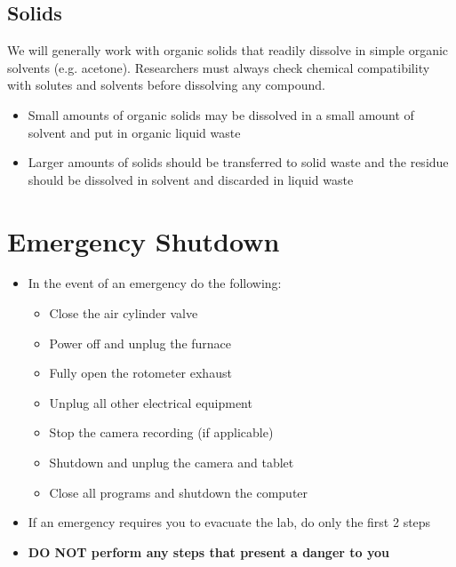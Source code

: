 \documentclass[letterpaper,11pt]{article}
\begin{document}
    \subsection{Solids} \label{sec:spill_solid}
    We will generally work with organic solids that readily dissolve in simple
    organic solvents (e.g. acetone). Researchers must always check chemical 
    compatibility with solutes and solvents before dissolving any compound.
    \begin{itemize}
    \item Small amounts of organic solids may be dissolved in a small amount of 
        solvent and put in organic liquid waste
    \item Larger amounts of solids should be transferred to solid waste and the
        residue should be dissolved in solvent and discarded in liquid waste
    \end{itemize}

\newpage    
\section{Emergency Shutdown} \label{sec:e_shtdn}

    \begin{itemize}
    \item In the event of an emergency do the following:
        
        \begin{itemize}
        \item Close the air cylinder valve
        \item Power off and unplug the furnace
        \item Fully open the rotometer exhaust
        \item Unplug all other electrical equipment
        \item Stop the camera recording (if applicable)
        \item Shutdown and unplug the camera and tablet
        \item Close all programs and shutdown the computer
        \end{itemize}
    
    \item If an emergency requires you to evacuate the lab, do only the first 
        2 steps
    \item \textbf{DO NOT perform any steps that present a danger to you}
    \end{itemize}

\newpage
\end{document}
